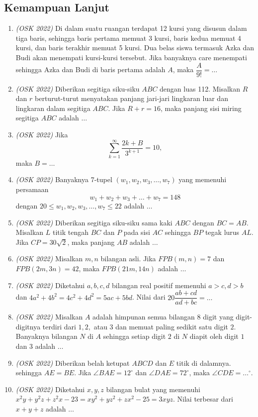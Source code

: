 \documentclass[11pt]{scrartcl}
\begin{document}
\subsection{Kemampuan Lanjut}
\begin{enumerate}
    \item \textit{(OSK 2022)} Di dalam suatu ruangan terdapat 12 kursi yang disusun dalam tiga baris, sehingga baris pertama memuat 3 kursi, baris kedua memuat 4 kursi, dan baris terakhir memuat 5 kursi. Dua belas siswa termasuk Azka dan Budi akan menempati kursi-kursi tersebut. Jika banyaknya care menempati sehingga Azka dan Budi di baris pertama adalah $A$, maka $\dfrac{A}{9!}=\dots$
    
    \item \textit{(OSK 2022)} Diberikan segitiga siku-siku $ABC$ dengan luas 112. Misalkan $R$ dan $r$ berturut-turut menyatakan panjang jari-jari lingkaran luar dan lingkaran dalam segitiga $ABC$. Jika  $R+r = 16$, maka panjang sisi miring segitiga $ABC$ adalah $\dots$
    
    \item \textit{(OSK 2022)} Jika
    \[
    \sum_{k=1}^\infty \frac{2k+B}{3^{k+1}} = 10,
    \]
    maka $B = \dots$
    
    \item \textit{(OSK 2022)} Banyaknya 7-tupel $(w_1,w_2,w_3,\dots,w_7)$ yang memenuhi persamaan $$w_1+w_2+w_3+\dots +w_7=148$$ dengan $20\leq w_1,w_2,w_3,\dots,w_7\leq 22$ adalah $\dots$
    
    \item \textit{(OSK 2022)} Diberikan segitiga siku-siku sama kaki $ABC$ dengan $BC = AB$. Misalkan $L$ titik tengah $BC$ dan $P$ pada sisi $AC$ sehingga $BP$ tegak lurus $AL$. Jika $CP = 30\sqrt{2}$, maka panjang $AB$ adalah $\dots$
    
    \item \textit{(OSK 2022)}  Misalkan $m,n$ bilangan asli. Jika $FPB(m,n) = 7$ dan $FPB(2m,3n) = 42$, maka $FPB(21m,14n)$ adalah $\dots$
    
    \item \textit{(OSK 2022)} Diketahui $a,b,c,d$ bilangan real positif memenuhi $a > c,d >b$ dan $4a^2+4b^2 = 4c^2+4d^2 = 5ac+5bd$. Nilai dari $20\dfrac{ab+cd}{ad+bc} = \dots$
    
    \item \textit{(OSK 2022)} Misalkan $A$ adalah himpunan semua bilangan 8 digit yang digit-digitnya terdiri dari $1, 2,$ atau $3$ dan memuat paling sedikit satu digit $2$. Banyaknya bilangan $N$ di $A$ sehingga setiap digit $2$ di $N$ diapit oleh digit $1$ dan $3$ adalah $\dots$
    
    \item \textit{(OSK 2022)} Diberikan belah ketupat $ABCD$ dan $E$ titik di dalamnya. sehingga $AE = BE$. Jika $\angle BAE = 12^\circ$ dan $\angle DAE = 72^\circ$, maka $\angle CDE = \dots^\circ$.
    
    \item \textit{(OSK 2022)} Diketahui $x,y,z$ bilangan bulat yang memenuhi $x^2y+y^2z+z^2x-23 = xy^2+yz^2+zx^2-25 = 3xyz$. Nilai terbesar dari $x+y+z$ adalah $\dots$
\end{enumerate}
\newpage
\end{document}
